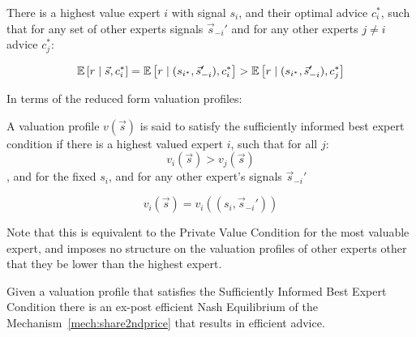 \begin{defn}\label{SufficientBestCondition}

There is a highest value expert $i$ with signal $s_{i}$, and their optimal advice $c^*_i$, such that for any set of other experts  signals $\vec{s}_{-i}'$ and for any other experts $j \neq i$ advice $c^*_j$:

$$ 
\operatorname*{\mathbb E} \left[r \mid \vec{s}, c^*_i \right]
=
\operatorname*{\mathbb E} \left[r \mid ( s_{i^*},\vec{s}_{-i}'), c^*_i \right]
>
\operatorname*{\mathbb E} \left[r \mid ( s_{i^*},\vec{s}_{-i}'), c^*_j \right]
$$


In terms of the reduced form valuation profiles:

A valuation profile $v(\vec{s})$ is said to satisfy the sufficiently informed best expert condition if  there is a  highest valued expert $i$, such that for all $j$: $$v_i(\vec{s}) > v_j(\vec{s})$$,
and for the fixed $s_i$, and for any other expert's  signals $\vec{s}_{-i}'$
	
	$$ v_i(\vec{s}) = v_i((s_i, \vec{s}_{-i}')) $$
\end{defn}

Note that this is equivalent to the  Private Value Condition for the most valuable expert, and imposes no structure on the valuation profiles of other experts other that they be lower than the highest expert. 

\begin{thm}\label{thm:2ndefficient}
Given a valuation profile that satisfies the Sufficiently Informed Best Expert Condition there is an ex-post efficient Nash Equilibrium of the Mechanism~\ref{mech:share2ndprice} that results in efficient advice.
\end{thm}

